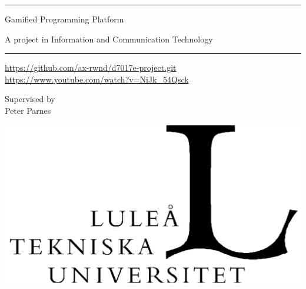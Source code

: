 \vspace{2\baselineskip}

\rule{\linewidth}{.02cm}

\vspace{\baselineskip}

\begin{minipage}{.45\linewidth}
\raggedright\Huge Gamified Programming Platform
\end{minipage}
\hfill
\begin{minipage}{.45\linewidth}
\raggedleft\Large A project in Information and Communication Technology
\end{minipage}

\vspace{-2\baselineskip}

\vfill

\Large\it\LTU

\vspace{-.33\baselineskip}
\rule{\widthof{\LTU{}}}{.02cm}
\vspace{.66\baselineskip}

\begin{minipage}{.45\linewidth}
\Large\it\SRT
\end{minipage}

\vfill

\begin{center}
\normalsize\url{https://github.com/ax-rwnd/d7017e-project.git} \\
\normalsize\url{https://www.youtube.com/watch?v=NiJk_54Qsck}
\end{center}

\vfill

\begin{minipage}[b]{.45\linewidth}
{\large Supervised by\\ Peter Parnes}
\vspace{\baselineskip}
\end{minipage}
\hfill
\begin{minipage}[b]{.35\linewidth}
\includegraphics[width=\linewidth]{img/LTU_logo.png}
\end{minipage}
